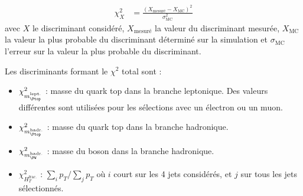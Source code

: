 \begin{align*}
  \chi^2_X &= \frac{\left( X_\text{mesuré} - X_\text{MC} \right)^2}{\sigma_\text{MC}^2}
\end{align*}
avec $X$ le discriminant considéré, $X_\text{mesuré}$ la valeur du discriminant mesurée, $X_\text{MC}$ la valeur la plus probable du discriminant déterminé sur la simulation et $\sigma_\text{MC}$ l'erreur sur la valeur la plus probable du discriminant.

Les discriminants formant le $\chi^2$ total sont :
\begin{itemize}
    \item $\chi^2_{m_{\Ptop}^{\text{lept.}}}$ : masse du quark top dans la branche leptonique. Des valeurs différentes sont utilisées pour les sélections avec un électron ou un muon.
    \item $\chi^2_{m_{\Ptop}^{\text{hadr.}}}$ : masse du quark top dans la branche hadronique.
    \item $\chi^2_{m_{\PW}^{\text{hadr.}}}$ : masse du boson \PW dans la branche hadronique.
    \item $\chi^2_{H_{T}^{\text{frac.}}}$ : $\sum\limits_i{p_T} / \sum\limits_j{p_T}$ où $i$ court sur les 4 jets considérés, et $j$ sur tous les jets sélectionnés.
\end{itemize}

